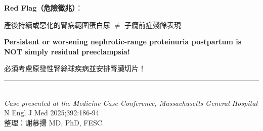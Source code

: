 \documentclass[12pt,a4paper]{article}
\begin{document}
\begin{importantbox}
\textbf{Red Flag（危險徵兆）}：

產後持續或惡化的腎病範圍蛋白尿 $\neq$ 子癇前症殘餘表現

\vspace{0.2cm}
\textbf{Persistent or worsening nephrotic-range proteinuria postpartum is NOT simply residual preeclampsia!}

\vspace{0.2cm}
必須考慮原發性腎絲球疾病並安排腎臟切片！
\end{importantbox}

\vspace{1cm}
\begin{center}
\textcolor{emergency_gray}{\rule{0.8\textwidth}{0.5pt}}\\[0.3cm]
\textit{Case presented at the Medicine Case Conference, Massachusetts General Hospital}\\
N Engl J Med 2025;392:186-94\\
整理：謝慕揚 MD, PhD, FESC
\end{center}
\end{document}
